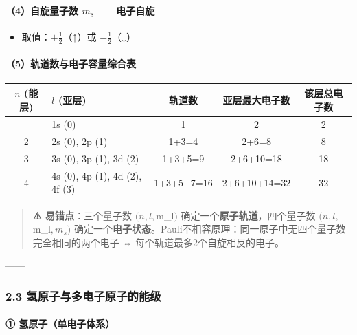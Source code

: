 \documentclass[a4paper,11pt]{ctexart}
\providecommand{\tightlist}{\setlength{\itemsep}{0pt}\setlength{\parskip}{0pt}}
\newcounter{none}
\begin{document}
\paragraph{\texorpdfstring{（4）自旋量子数 \(m_s\)------电子自旋}{（4）自旋量子数 m\_s------电子自旋}}\label{ux81eaux65cbux91cfux5b50ux6570-m_sux7535ux5b50ux81eaux65cb}

\begin{itemize}
\tightlist
\item
  取值：\(+\frac{1}{2}\)（↑）或 \(-\frac{1}{2}\)（↓）
\end{itemize}

\paragraph{（5）轨道数与电子容量综合表}\label{ux8f68ux9053ux6570ux4e0eux7535ux5b50ux5bb9ux91cfux7efcux5408ux8868}

{\def\LTcaptype{none} %
\begin{longtable}[]{@{}clccc@{}}
\toprule\noalign{}
\(n\) (能层) & \(l\) (亚层) & 轨道数 & 亚层最大电子数 & 该层总电子数 \\
\midrule\noalign{}
\endhead
\bottomrule\noalign{}
\endlastfoot
1 & 1s (0) & 1 & 2 & 2 \\
2 & 2s (0), 2p (1) & 1+3=4 & 2+6=8 & 8 \\
3 & 3s (0), 3p (1), 3d (2) & 1+3+5=9 & 2+6+10=18 & 18 \\
4 & 4s (0), 4p (1), 4d (2), 4f (3) & 1+3+5+7=16 & 2+6+10+14=32 & 32 \\
\end{longtable}
}

\begin{quote}
\textbf{⚠️ 易错点}：三个量子数 \((n,l,\)m\_l\()\) 确定一个\textbf{原子轨道}，四个量子数 \((n,l,\)m\_l\(,m_s)\) 确定一个\textbf{电子状态}。Pauli不相容原理：同一原子中无四个量子数完全相同的两个电子 ⇔ 每个轨道最多2个自旋相反的电子。
\end{quote}

------

\subsubsection{2.3 氢原子与多电子原子的能级}\label{ux6c22ux539fux5b50ux4e0eux591aux7535ux5b50ux539fux5b50ux7684ux80fdux7ea7}

\paragraph{① 氢原子（单电子体系）}\label{ux6c22ux539fux5b50ux5355ux7535ux5b50ux4f53ux7cfb}
\end{document}
